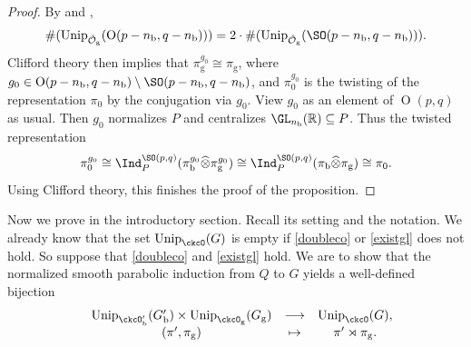 \documentclass[11pt,a4paper]{amsart}
\newcommand{\CO}{{\mathcal {O}}}
\newcommand{\oO}{\operatorname{O}}
\newcommand{\R}{\mathbb R}
\numberwithin{equation}{section}
\theoremstyle{remark}
\def\Unip{\mathrm{Unip}}
\begin{document}
\begin{proof}
By  and \cite[Theorem 2.27]{BMSZa},  
\[
\#(\Unip_{\check \CO_\mathrm g}(\oO(p-n_\mathrm b,q-n_\mathrm b)))=2 \cdot \#(\Unip_{\check \CO_\mathrm g}(\SO(p-n_\mathrm b,q-n_\mathrm b))).
\]
Clifford theory then implies that $\pi_\mathrm g^{g_0}\cong \pi_\mathrm g$, where $g_0\in \oO(p-n_\mathrm b,q-n_\mathrm b)\setminus \SO(p-n_\mathrm b,q-n_\mathrm b)$, and $\pi_0^{g_0}$ is the twisting of the representation $\pi_0$ by the conjugation via $g_0$. View $g_0$ as an element of $\oO(p,q)$ as usual. Then $g_0$ normalizes $P$ and centralizes $\GL_{n_\mathrm b}(\R)\subseteq P$. Thus
the twisted representation 
\[
 \pi_0^{g_0}\cong \Ind_P^{\SO(p,q)}( \pi_\mathrm b^{g_0}\widehat \otimes \pi_\mathrm g^{g_0})\cong \Ind_P^{\SO(p,q)}( \pi_\mathrm b\widehat \otimes \pi_\mathrm g)\cong \pi_0. 
\]
Using Clifford theory, this finishes the proof of the proposition. 
\end{proof}

Now we prove  in the introductory section.  Recall its setting and the notation. We already know that the set $\Unip_{\ckcO }(G)$ is empty if \eqref{doubleco} or \eqref{existgl} does not hold. 
 So suppose that  \eqref{doubleco} and \eqref{existgl} hold. We are to show that the normalized smooth parabolic induction from $Q$ to $G$ yields
   a well-defined bijection
   \[
    \begin{array}{rccc}
 &\Unip_{\ckcO'_{\mathrm b}}( G'_{\mathrm b}) \times   \Unip_{\ckcO_{\mathrm g}}( G_{\mathrm g})  &         \longrightarrow &\Unip_{\ckcO }(G), \\
                &   (\pi',\pi_\mathrm g) & \mapsto & \pi'\rtimes \pi_\mathrm g.
    \end{array}
 \]
\end{document}
